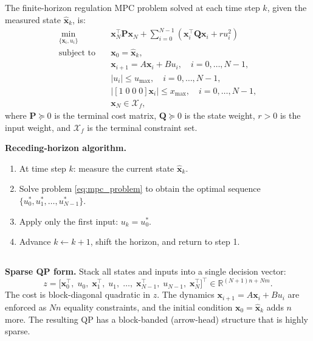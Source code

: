 \subsection{}
The finite-horizon regulation MPC problem solved at each time step $k$, given the measured state $\hat{\mathbf{x}}_k$, is:
\begin{equation}
\begin{aligned}
    \min_{\{\mathbf{x}_i, u_i\}} \quad & \mathbf{x}_N^\top \mathbf{P}\mathbf{x}_N + \sum_{i=0}^{N-1}\left(\mathbf{x}_i^\top \mathbf{Q}\mathbf{x}_i + ru_i^2\right) \\
    \text{subject to} \quad
    & \mathbf{x}_0 = \hat{\mathbf{x}}_k, \\
    & \mathbf{x}_{i+1} = A\mathbf{x}_i + Bu_i, \quad i = 0,\ldots,N-1, \\
    & |u_i| \leq u_{\max}, \quad i = 0,\ldots,N-1, \\
    & \bigl|[1\;0\;0\;0]\mathbf{x}_i\bigr| \leq x_{\max}, \quad i = 0,\ldots,N-1, \\
    & \mathbf{x}_N \in \mathcal{X}_f,
\end{aligned}
\label{eq:mpc_problem}
\end{equation}
where $\mathbf{P} \succeq 0$ is the terminal cost matrix, $\mathbf{Q} \succeq 0$ is the state weight, $r > 0$ is the input weight, and $\mathcal{X}_f$ is the terminal constraint set.

\textbf{Receding-horizon algorithm.}
\begin{enumerate}
    \item At time step $k$: measure the current state $\hat{\mathbf{x}}_k$.
    \item Solve problem \eqref{eq:mpc_problem} to obtain the optimal sequence $\{u_0^*, u_1^*, \ldots, u_{N-1}^*\}$.
    \item Apply only the first input: $u_k = u_0^*$.
    \item Advance $k \leftarrow k+1$, shift the horizon, and return to step 1.
\end{enumerate}

\subsection{}
\textbf{Sparse QP form.} Stack all states and inputs into a single decision vector:
\begin{equation}
    z = \bigl[\mathbf{x}_0^\top,\; u_0,\; \mathbf{x}_1^\top,\; u_1,\; \ldots,\; \mathbf{x}_{N-1}^\top,\; u_{N-1},\; \mathbf{x}_N^\top\bigr]^\top \in \mathbb{R}^{(N+1)n + Nm}.
\end{equation}
The cost is block-diagonal quadratic in $z$. The dynamics $\mathbf{x}_{i+1} = A\mathbf{x}_i + Bu_i$ are enforced as $Nn$ equality constraints, and the initial condition $\mathbf{x}_0 = \hat{\mathbf{x}}_k$ adds $n$ more. The resulting QP has a block-banded (arrow-head) structure that is highly sparse.

